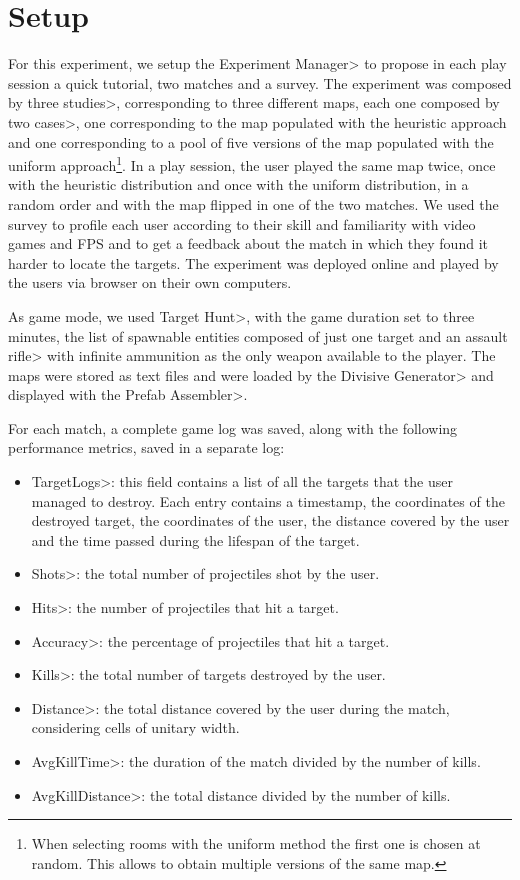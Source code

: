 
\section{Setup}

For this experiment, we setup the \<Experiment Manager> to propose in each play session a quick tutorial, two matches and a survey. The experiment was composed by three \<studies>, corresponding to three different maps, each one composed by two \<cases>, one corresponding to the map populated with the heuristic approach and one corresponding to a pool of five versions of the map populated with the uniform approach\footnote{When selecting rooms with the uniform method the first one is chosen at random. This allows to obtain multiple versions of the same map.}. In a play session, the user played the same map twice, once with the heuristic distribution and once with the uniform distribution, in a random order and with the map flipped in one of the two matches. We used the survey to profile each user according to their skill and familiarity with video games and FPS and to get a feedback about the match in which they found it harder to locate the targets. The experiment was deployed online and played by the users via browser on their own computers.

\par

As game mode, we used \<Target Hunt>, with the game duration set to three minutes, the list of spawnable entities composed of just one target and an \<assault rifle> with infinite ammunition as the only weapon available to the player. The maps were stored as text files and were loaded by the \<Divisive Generator> and displayed with the \<Prefab Assembler>. 

\par

For each match, a complete game log was saved, along with the following performance metrics, saved in a separate log:
\begin{itemize}
\item \<TargetLogs>: this field contains a list of all the targets that the user managed to destroy. Each entry contains a timestamp, the coordinates of the destroyed target, the coordinates of the user, the distance covered by the user and the time passed during the lifespan of the target.
\item \<Shots>: the total number of projectiles shot by the user.
\item \<Hits>: the number of projectiles that hit a target.
\item \<Accuracy>: the percentage of projectiles that hit a target.
\item \<Kills>: the total number of targets destroyed by the user.
\item \<Distance>: the total distance covered by the user during the match, considering cells of unitary width.
\item \<AvgKillTime>: the duration of the match divided by the number of kills.
\item \<AvgKillDistance>: the total distance divided by the number of kills.
\end{itemize}

